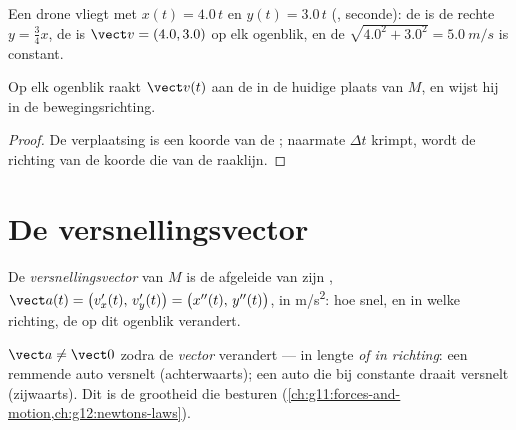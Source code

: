 \begin{example}\label{ex:g12:kinematics-2d:drone}
Een drone vliegt met $x(t) = 4.0\,t$ en $y(t) = 3.0\,t$ (,
seconde): de  is de rechte $y = \tfrac34 x$, de  is
$\vect v = (4.0, 3.0)$ op elk ogenblik, en de 
$\sqrt{4.0^2 + 3.0^2} = \qty{5.0}{m/s}$ is constant.
\end{example}

\begin{proposition}\label{prop:g12:kinematics-2d:tangent}
Op elk ogenblik raakt $\vect v(t)$ aan de  in de huidige plaats van
$M$, en wijst hij in de bewegingsrichting.
\end{proposition}

\begin{proof}
De verplaatsing is een koorde van de ; naarmate $\Delta t$ krimpt,
wordt de richting van de koorde die van de raaklijn.
\end{proof}

\section{De versnellingsvector}

\begin{definition}[Versnellingsvector]\label{def:g12:kinematics-2d:acceleration}
De \emph{versnellingsvector} van $M$ is de
afgeleide van zijn ,
$\vect a(t) = \bigl(v_x'(t),\, v_y'(t)\bigr) =
\bigl(x''(t),\, y''(t)\bigr)$, in \unit{m/s^2}: hoe snel, en in welke
richting, de  op dit ogenblik verandert.
\end{definition}

\begin{remark}\label{rem:g12:kinematics-2d:turning}
$\vect a \neq \vect 0$ zodra de \emph{vector} verandert --- in
lengte \emph{of in richting}: een remmende auto versnelt (achterwaarts);
een auto die bij constante  draait versnelt (zijwaarts). Dit is de
grootheid die  besturen
(\cref{ch:g11:forces-and-motion,ch:g12:newtons-laws}).
\end{remark}

